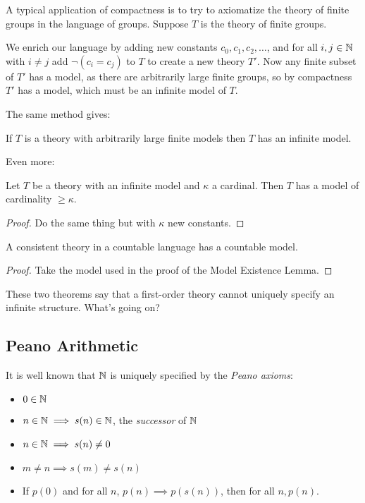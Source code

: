 \documentclass[10pt,a4paper]{article}
\begin{document}
A typical application of compactness is to try to axiomatize the theory of finite groups in the language of groups. Suppose $T$ is the theory of finite groups.

We enrich our language by adding new constants $c_0, c_1, c_2, \ldots$, and for all $i,j \in \mathbb{N}$ with $i \neq j$ add $\neg(c_i =c_j)$ to $T$ to create a new theory $T'$. Now any finite subset of $T'$ has a model, as there are arbitrarily large finite groups, so by compactness $T'$ has a model, which must be an infinite  model of $T$. \contr

The same method gives:
\begin{proposition}
If $T$ is a theory with arbitrarily large finite models then $T$ has an infinite model.
\end{proposition}
Even more:
\begin{theorem}
Let $T$ be a theory with an infinite model and $\kappa$ a cardinal. Then $T$ has a model of cardinality $\geq \kappa$.
\end{theorem}
\begin{proof}
Do the same thing but with $\kappa$ new constants.
\end{proof}
\begin{theorem}
A consistent theory in a countable language has a countable model.
\end{theorem}
\begin{proof}
Take the model used in the proof of the Model Existence Lemma.
\end{proof}
These two theorems say that a first-order theory cannot uniquely specify an infinite structure. What's going on?

\subsection{Peano Arithmetic}
It is well known that $\mathbb{N}$ is uniquely specified by the \emph{Peano axioms}:
\begin{itemize}
\item $0 \in \mathbb{N}$
\item $n \in \mathbb{N} \implies s(n) \in \mathbb{N}$, the \emph{successor} of $\mathbb{N}$
\item $n \in \mathbb{N} \implies s(n) \neq 0$
\item $m \neq n \implies s(m) \neq s(n)$
\item If $p(0)$ and for all $n$, $p(n) \implies p(s(n))$, then for all $n, p(n)$.
\end{itemize}
\end{document}
